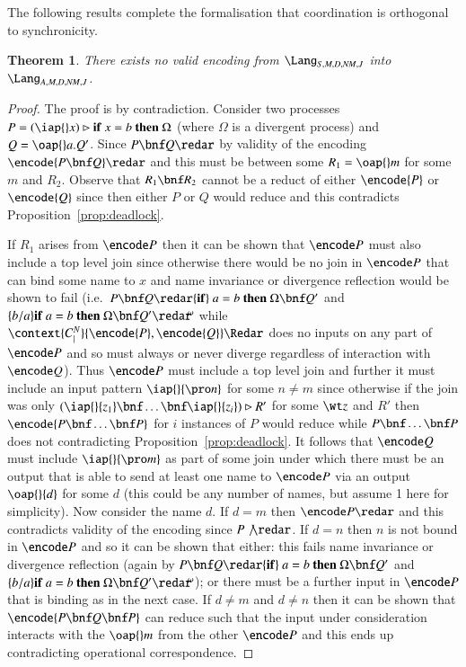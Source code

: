 \documentclass[submission,copyright,creativecommons]{eptcs}
\newtheorem{theorem}{Theorem}[section]
\newcommand{\ift}[3]{{\bf if}\ #1=#2\ {\bf then}\ #3}
\newcommand{\join}[1]{(#1)\rhd }
\begin{document}
The following results complete the formalisation that coordination is orthogonal to synchronicity.

\begin{theorem}
\label{thm:no_synch_2_asynch}
There exists no valid encoding from $\Lang_{S,M,D,\mathit{NM},J}$ into $\Lang_{A,M,D,\mathit{NM},J}$.
\end{theorem}
\begin{proof}
The proof is by contradiction. Consider two processes
$P=\join{\iap {} x}\ift x b \Omega$ (where $\Omega$ is a divergent process) and $Q=\oap {} a . Q'$.
Since $P\bnf Q\redar$ by validity of the encoding $\encode{P\bnf Q}\redar$ and this must be
between some $R_1=\oap {} m$ for some $m$ and $R_2$. 
Observe that $R_1\bnf R_2$ cannot be a reduct of either $\encode {P}$ or $\encode{Q}$ since then
either $P$ or $Q$ would reduce and this contradicts Proposition~\ref{prop:deadlock}.

If $R_1$ arises from $\encode P$ then it can be shown that $\encode P$ must also include a top level
join since otherwise there would be no join in $\encode P$ that can bind some name to $x$ and
name invariance or divergence reflection would be shown to fail
(i.e.~$P\bnf Q\redar\ift a b\Omega\bnf Q'$ and $\{b/a\}\ift a b\Omega\bnf Q'\redar\!\!^\omega$ while
$\context{C^N_|}{\encode{P},\encode {Q}}\Redar$ does no inputs on any part of $\encode P$
and so must always or never diverge regardless of interaction with $\encode Q$).
Thus $\encode P$ must include a top level join and further it must include an input pattern
$\iap {} {\pro n}$ for some $n\neq m$ since otherwise if the join was only
$\join{\iap {} {z_1}\bnf\ldots\bnf\iap {}{z_i}}R'$ for some $\wt z$ and $R'$ then
$\encode{P\bnf \ldots\bnf P}$ for $i$ instances of $P$ would reduce while $P\bnf \ldots\bnf P$
does not contradicting Proposition~\ref{prop:deadlock}.
It follows that $\encode Q$ must include $\iap {} {\pro m}$ as part of some join under which there
must be an output that is able to send at least one name to $\encode P$ via an output $\oap {} {d}$ for some $d$
(this could be any number of names, but assume 1 here for simplicity).
Now consider the name $d$.
If $d=m$ then $\encode P \redar$ and this contradicts validity of the encoding since $P\not\redar$.
If $d=n$ then $n$ is not bound in $\encode P$ and so it can be shown that either: this fails name invariance
or divergence reflection
(again by $P\bnf Q\redar\ift a b\Omega\bnf Q'$ and $\{b/a\}\ift a b\Omega\bnf Q'\redar\!\!^\omega$);
or there must be a further input in $\encode P$ that is binding as in the next case.
If $d\neq m$ and $d\neq n$ then it can be shown that $\encode{P\bnf Q\bnf P}$ can reduce such that the
input under consideration interacts with the $\oap {} m$ from the other $\encode P$
and this ends up contradicting operational correspondence.


\end{proof}
\end{document}
